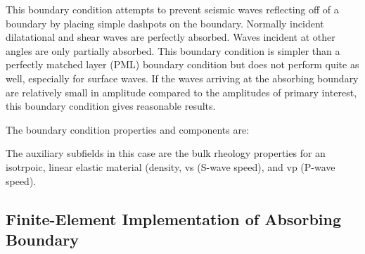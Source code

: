 This  boundary condition attempts to prevent
seismic waves reflecting off of a boundary by placing simple dashpots
on the boundary. Normally incident dilatational and shear waves are
perfectly absorbed. Waves incident at other angles are only partially
absorbed. This boundary condition is simpler than a perfectly matched
layer (PML) boundary condition but does not perform quite as well,
especially for surface waves. If the waves arriving at the absorbing
boundary are relatively small in amplitude compared to the amplitudes
of primary interest, this boundary condition gives reasonable results.

The  boundary condition properties and components are:
\begin{inventory}
\end{inventory}

The auxiliary subfields in this case are the bulk rheology properties
for an isotrpoic, linear elastic material (density, vs (S-wave speed),
and vp (P-wave speed).

\subsection{Finite-Element Implementation of Absorbing Boundary}


